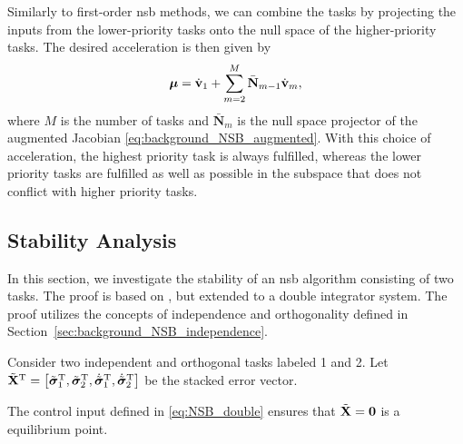 Similarly to first-order \gls{nsb} methods, we can combine the tasks by projecting the inputs from the lower-priority tasks onto the null space of the higher-priority tasks.
The desired acceleration is then given by
\begin{equation}
    \bm{\mu} = \dot{\mathbf{v}}_1 + \sum_{m=2}^M \bar{\mathbf{N}}_{m-1}\dot{\mathbf{v}}_m,
    \label{eq:NSB_double}
\end{equation}
where $M$ is the number of tasks and $\bar{\mathbf{N}}_m$ is the null space projector of the augmented Jacobian \eqref{eq:background_NSB_augmented}.
With this choice of acceleration, the highest priority task is always fulfilled, whereas the lower priority tasks are fulfilled as well as possible in the subspace that does not conflict with higher priority tasks.

\subsection{Stability Analysis}
In this section, we investigate the stability of an \gls{nsb} algorithm consisting of two tasks.
The proof is based on \cite{antonelli_stability_2008}, but extended to a double integrator system.
The proof utilizes the concepts of independence and orthogonality defined in Section~\ref{sec:background_NSB_independence}.

\begin{lemma}\label{theorem:one}
    Consider two independent and orthogonal tasks labeled 1 and 2.
    Let
    $
        \Tilde{\mathbf{X}}^{\mathrm{T}} = \left[\Tilde{\bm{\sigma}}_1^{\mathrm{T}}, \Tilde{\bm{\sigma}}_2^{\mathrm{T}}, \dot{\Tilde{\bm{\sigma}}}_1^{\mathrm{T}}, \dot{\Tilde{\bm{\sigma}}}_2^{\mathrm{T}} \right]
    $
    be the stacked error vector.

    The control input defined in \eqref{eq:NSB_double} ensures that $\Tilde{\mathbf{X}} = \mathbf{0}$ is a  equilibrium point.
\end{lemma}

